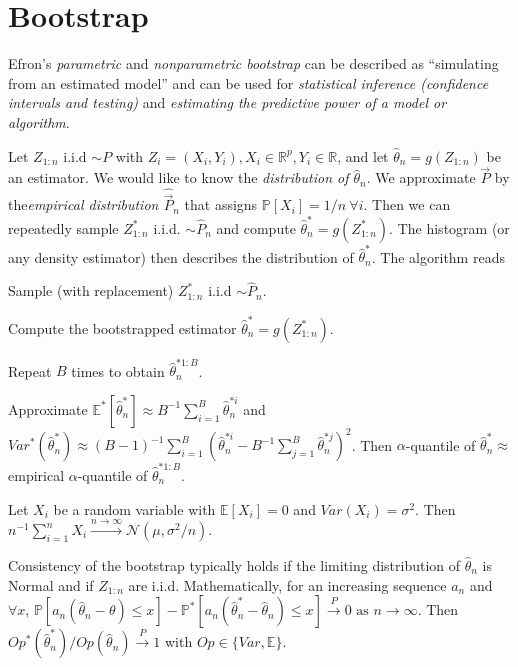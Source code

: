 \section{Bootstrap}\label{sec:bootstrap}
Efron's \emph{parametric} and \emph{nonparametric bootstrap} can be described as ``simulating from an estimated model'' and can be used for \emph{statistical inference (confidence intervals and testing)} and \emph{estimating the predictive power of a model or algorithm}.

\begin{sectionbox}\nospacing{}
  Let $Z_{1:n}$ i.i.d $\sim P$ with $Z_i=(X_i, Y_i), X_i \in \mathbb{R}^p, Y_i \in \mathbb{R}$, and let $\hat \theta_n = g(Z_{1:n})$ be an estimator.
  We would like to know the \emph{distribution of $\hat \theta_n$}.
  We approximate $\vec{P}$ by the\emph{empirical distribution $\hat{\vec{P}}_n$} that assigns $\mathbb{P}[X_i] = 1/n\ \forall i$.
  Then we can repeatedly sample $Z_{1:n}^\ast$ i.i.d. $\sim \hat P_n$ and compute $\hat\theta_n^\ast = g(Z_{1:n}^\ast)$.
  The histogram (or any density estimator) then describes the distribution of $\hat{\theta}_n^\ast$.
  The algorithm reads
  \begin{enumeratenosep}
    \item Sample (with replacement) $Z_{1:n}^\ast$ i.i.d $\sim \hat P_n$.
    \item Compute the bootstrapped estimator $\hat\theta_n^\ast=g(Z_{1:n}^\ast)$.
    \item Repeat $B$ times to obtain $\hat \theta_n^{\ast 1:B}$.
    \item Approximate $\mathbb{E}^\ast[\hat\theta_n^\ast] \approx B^{-1}\sum_{i=1}^B\hat\theta_n^{\ast i}$ and $Var^\ast(\hat\theta_n^\ast) \approx (B-1)^{-1}\sum_{i=1}^B\left(\hat\theta_n^{\ast i} - B^{-1}\sum_{j=1}^B \hat\theta_n^{\ast j}\right)^2$.
      Then $\alpha$-quantile of $\hat\theta_n^\ast \approx $ empirical $\alpha$-quantile of $\hat\theta_n^{\ast 1:B}$.
  \end{enumeratenosep}
\end{sectionbox}

\begin{notebox}\nospacing{}
  Let $X_i$ be a random variable with $\mathbb{E}[X_i] = 0$ and $Var(X_i) = \sigma^2$. Then $n^{-1}\sum_{i=1}^nX_i \overset{n\to \infty}{\to} \mathcal{N}(\mu, \sigma^2/n)$.
\end{notebox}
\begin{notebox}\nospacing{}
  Consistency of the bootstrap typically holds if the limiting distribution of $\hat \theta_n$ is Normal and if $Z_{1:n}$ are i.i.d. 
  Mathematically, for an increasing sequence $a_n$ and $\forall x$, $\mathbb{P}[a_n(\hat\theta_n-\theta)\leq x] - \mathbb{P}^\ast[a_n(\hat\theta_n^\ast - \hat \theta_n) \leq x] \overset{P}\to 0 \text{ as } n \to \infty$.
  Then $Op^\ast(\hat\theta_n^\ast)/Op(\hat\theta_n) \overset{P}{\to} 1$ with $Op \in \{Var, \mathbb{E}\}$.
\end{notebox}


